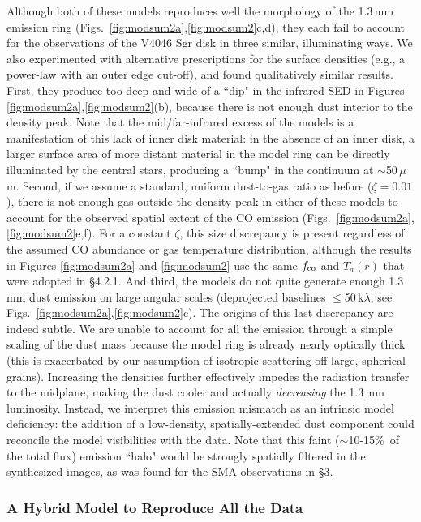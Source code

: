 {Although both of these models reproduces well the morphology of the 1.3\,mm 
emission ring (Figs.~\ref{fig:modsum2a},\ref{fig:modsum2}c,d), they each 
fail to account for the observations of the V4046 Sgr disk in three similar, 
illuminating ways.  We also experimented with alternative prescriptions for the
surface densities (e.g., a power-law with an outer edge cut-off), and found 
qualitatively similar results.  First, they produce too
deep and wide of a ``dip" in the infrared SED in Figures 
\ref{fig:modsum2a},\ref{fig:modsum2}(b), because there is not enough dust 
interior to the density peak.  Note that the mid/far-infrared
excess of the models is a manifestation of this lack of inner disk material: in 
the absence of an inner disk, a larger surface area of more distant material in 
the model ring can be directly illuminated by the central stars, producing a 
``bump" in the continuum at $\sim$50\,$\mu$m.  Second, if we assume a standard, 
uniform dust-to-gas ratio as before ($\zeta = 0.01$), there is not enough gas 
outside the density peak in either of these models to account for the observed 
spatial extent of the CO emission 
(Figs.~\ref{fig:modsum2a},\ref{fig:modsum2}e,f).  For a constant $\zeta$, this 
size discrepancy is present regardless of the assumed CO abundance or gas 
temperature distribution, although the results in Figures \ref{fig:modsum2a} and
\ref{fig:modsum2} use the same $f_{\rm co}$ and $T_a(r)$ that were adopted in 
\S 4.2.1.  And third, the models do not quite generate enough 1.3\,mm dust 
emission on large angular scales (deprojected baselines $\le$50\,k$\lambda$; 
see Figs.~\ref{fig:modsum2a},\ref{fig:modsum2}c).  The origins of 
this last discrepancy are indeed subtle.  We are unable to account for all the 
emission through a simple scaling of the dust mass because the model ring is 
already nearly optically thick (this is exacerbated by our assumption of 
isotropic scattering off large, spherical grains).  Increasing the densities 
further effectively impedes the
radiation transfer to the midplane, making the dust cooler and actually {\it 
decreasing} the 1.3\,mm luminosity.  Instead, we interpret this emission 
mismatch as an intrinsic model deficiency: the addition of a low-density, 
spatially-extended dust component could reconcile the model visibilities with 
the data.  Note that this faint ($\sim$10-15\%\ of 
the total flux) emission ``halo" would be strongly spatially filtered in the 
synthesized images, as was found for the SMA observations in \S 3.


\subsubsection{A Hybrid Model to Reproduce All the Data}\label{sec:model3}

}
